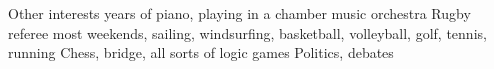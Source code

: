 \begin{rubric}{\color{Gray} Other interests}
 years of piano, playing in a chamber music orchestra
\entry*[Sports] Rugby referee most weekends, sailing, windsurfing, basketball, volleyball, 
golf, tennis, running
\entry*[Games] Chess, bridge, all sorts of logic games
\entry*[Social] Politics, debates
\end{rubric}
